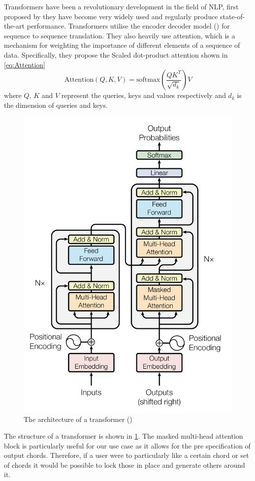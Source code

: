 Transformers have been a revolutionary development in the field of NLP, first proposed by  they have become very widely used and regularly produce state-of-the-art performance.
Transformers utilise the encoder decoder model (\cite{EncoderDecoder}) for sequence to sequence translation.
They also heavily use attention, which is a mechanism for weighting the importance of different elements of a sequence of data.
Specifically, they propose the Scaled dot-product attention shown in \cref{eq:Attention}
\begin{equation}
    \text{Attention}(Q,K,V) = \text{softmax}(\frac{QK^T}{\sqrt{d_k}})V
    \label{eq:Attention}
\end{equation}
where $Q$, $K$ and $V$ represent the queries, keys and values respectively and $d_k$ is the dimension of queries and keys.

\begin{figure}
    \centering
    \includegraphics[width=0.6\columnwidth]{Figures/Transformer}
    \decoRule
    \caption{The architecture of a transformer (\cite{Transformers})}
    \label{fig:Transformer}
\end{figure}

The structure of a transformer is shown in \cref{fig:Transformer}.
The masked multi-head attention block is particularly useful for our use case as it allows for the pre specification of output chords.
Therefore, if a user were to particularly like a certain chord or set of chords it would be possible to lock those in place and generate others around it.

